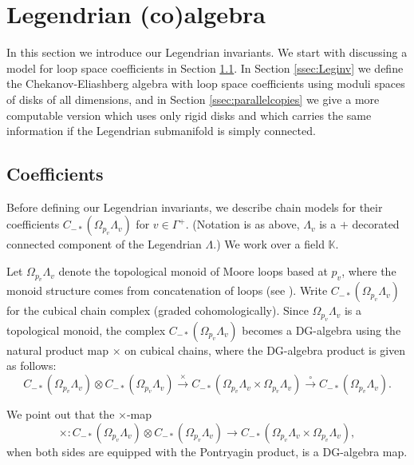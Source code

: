 \documentclass{gtpart}
\begin{document}
\section{Legendrian (co)algebra}
In this section we introduce our Legendrian invariants. We start with discussing a model for loop space coefficients in Section \ref{Coefficients}. In Section \ref{ssec:Leginv} we define the Chekanov-Eliashberg algebra with loop space coefficients using moduli spaces of disks of all dimensions, and in Section \ref{ssec:parallelcopies} we give a more computable version which uses only rigid disks and which carries the same information if the Legendrian submanifold is simply connected.   


\subsection{Coefficients} 
\label{Coefficients} 

Before defining our Legendrian invariants, we describe
chain models for their coefficients $C_{-*}(\Omega_{p_v} \Lambda_v)$ for $v \in \Gamma^+$. (Notation is as above, $\Lambda_{v}$ is a $+$ decorated connected component of the Legendrian $\Lambda$.)  We work over a field $\mathbb{K}$. 

Let $\Omega_{p_v} \Lambda_v$ denote the topological monoid of Moore loops based at
$p_v$, where the monoid structure comes from concatenation of loops (see \cite{AH}).
Write $C_{-*}(\Omega_{p_v} \Lambda_v)$ for the cubical chain complex (graded
cohomologically). Since $\Omega_{p_v} \Lambda_v$ is a topological monoid, the complex
$C_{-*}(\Omega_{p_v} \Lambda_v)$ becomes a DG-algebra using the natural product map $\times$ on cubical chains, where the DG-algebra product is given as follows:
\[ 
C_{-*}(\Omega_{p_v} \Lambda_v) \otimes C_{-*}(\Omega_{p_v} \Lambda_v)
\xrightarrow{\times} C_{-*}(\Omega_{p_v} \Lambda_v \times \Omega_{p_v} \Lambda_v)
\xrightarrow{\circ} C_{-*}(\Omega_{p_v} \Lambda_v). 
\]

We point out that the $\times$-map
\[ \mathrm{\times}\colon C_{-*}(\Omega_{p_v} \Lambda_v) \otimes C_{-*}(\Omega_{p_v} \Lambda_v)
\to C_{-*}(\Omega_{p_v} \Lambda_v \times \Omega_{p_v} \Lambda_v), \]
when both sides are equipped with the Pontryagin product, is a DG-algebra map.
\end{document}
